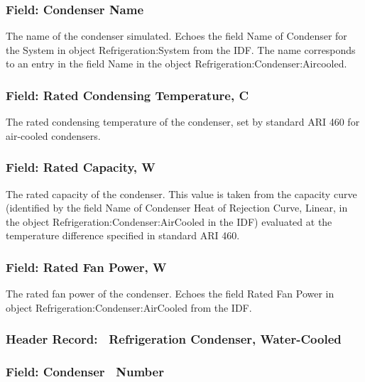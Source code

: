 \subsubsection{Field: Condenser Name}\label{field-condenser-name-1}

The name of the condenser simulated. Echoes the field Name of Condenser for the System in object Refrigeration:System from the IDF. The name corresponds to an entry in the field Name in the object Refrigeration:Condenser:Aircooled.

\subsubsection{Field: Rated Condensing Temperature, C}\label{field-rated-condensing-temperature-c}

The rated condensing temperature of the condenser, set by standard ARI 460 for air-cooled condensers.

\subsubsection{Field: Rated Capacity, W}\label{field-rated-capacity-w}

The rated capacity of the condenser. This value is taken from the capacity curve (identified by the field Name of Condenser Heat of Rejection Curve, Linear, in the object Refrigeration:Condenser:AirCooled in the IDF) evaluated at the temperature difference specified in standard ARI 460.

\subsubsection{Field: Rated Fan Power, W}\label{field-rated-fan-power-w}

The rated fan power of the condenser. Echoes the field Rated Fan Power in object Refrigeration:Condenser:AirCooled from the IDF.

\subsubsection{Header Record:~ Refrigeration Condenser, Water-Cooled}\label{header-record-refrigeration-condenser-water-cooled}

\subsubsection{Field: Condenser~ Number}\label{field-condenser-number-2}

